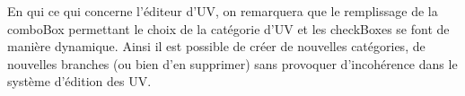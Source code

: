 \documentclass[a4paper,10pt,french]{report}
\begin{document}
	En qui ce qui concerne l'éditeur d'UV, on remarquera que le remplissage de la comboBox permettant le choix de la catégorie d'UV et les checkBoxes se font de manière dynamique. Ainsi il est possible de créer de nouvelles catégories, de nouvelles branches (ou bien d'en supprimer) sans provoquer d'incohérence dans le système d'édition des UV.
	
	
	
	
	
		\subsubsection{}
			\paragraph{}
			\paragraph{}
			\paragraph{}
		\subsubsection{}
			\paragraph{}
			\paragraph{}
			\paragraph{}
		\subsubsection{}
			\paragraph{}
			\paragraph{}
			\paragraph{}	
	\subsection{}\label{}
	
\end{document}
